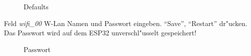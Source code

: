 \documentclass[ngerman,11pt,parskip=half] {scrartcl}
\begin{document}
\begin{figure}[H]
\centering
{}
\caption{Defaults} \label{fig:1}
\end{figure}

Feld \emph{wifi\_00} W-Lan Namen und Passwort eingeben. "`Save"', "`Restart"' dr"ucken. Das Passwort wird auf dem ESP32 unverschl"usselt gespeichert!

\begin{figure}[H]
\centering
{}
\caption{Passwort} \label{fig:1}
\end{figure}
\end{document}
